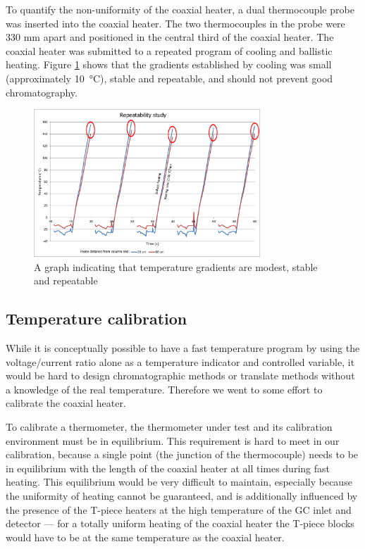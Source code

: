 \documentclass[aip,rsi,preprint,graphicx]{revtex4-1} %
\begin{document}
To quantify the non-uniformity of the coaxial heater, a dual thermocouple probe
was inserted into the coaxial heater. The two thermocouples in the probe were
330 mm apart and positioned in the central third of the coaxial heater. The
coaxial heater was submitted to a repeated program of cooling and ballistic
heating. Figure \ref{fig:Repeatability} shows that the gradients established by
cooling was small (approximately \SI{10}{\celsius}), stable and repeatable, and
should not prevent good chromatography.

\begin{figure}
	\includegraphics[width=8.5cm]{./Figures/cp.pdf}%
	\caption{\label{fig:Repeatability}A graph indicating that temperature gradients are modest, stable and repeatable}%
\end{figure}

\subsection{Temperature calibration}

While it is conceptually possible to have a fast temperature program by using
the voltage/current ratio alone as a temperature indicator and controlled
variable, it would be hard to design chromatographic methods or translate
methods without a knowledge of the real temperature. Therefore we went to some
effort to calibrate the coaxial heater.

To calibrate a thermometer, the thermometer under test and its calibration
environment must be in equilibrium. This requirement is hard to meet in our
calibration, because a single point (the junction of the thermocouple) needs to
be in equilibrium with the length of the coaxial heater at all times during fast
heating. This equilibrium would be very difficult to maintain, especially
because the uniformity of heating cannot be guaranteed, and is additionally
influenced by the presence of the T-piece heaters at the high temperature of the
GC inlet and detector --- for a totally uniform heating of the coaxial heater the
T-piece blocks would have to be at the same temperature as the coaxial heater.
\end{document}
